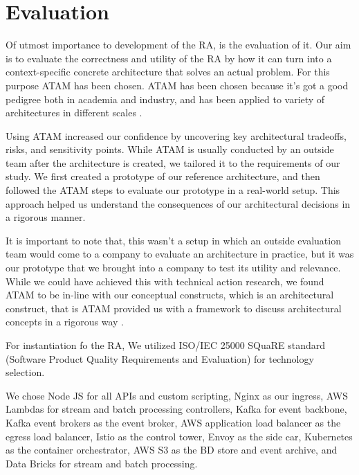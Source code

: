 \documentclass[conference]{IEEEtran}
\begin{document}

\section*{Evaluation}

Of utmost importance to development of the RA, is the evaluation of it. Our aim is to evaluate the correctness and utility of the RA by how it can turn into a context-specific concrete architecture that solves an actual problem. For this purpose ATAM has been chosen. ATAM has been chosen because it's got a good pedigree both in academia and industry, and has been applied to variety of architectures in different scales \cite{SoftwareArchitectureKazman}. 

Using ATAM increased our confidence by uncovering key architectural tradeoffs, risks, and sensitivity points. While ATAM is usually conducted by an outside team after the architecture is created, we tailored it to the requirements of our study. We first created a prototype of our reference architecture, and then followed the ATAM steps to evaluate our prototype in a real-world setup. This approach helped us understand the consequences of our architectural decisions in a rigorous manner.

It is important to note that, this wasn't a setup in which an outside evaluation team would come to a company to evaluate an architecture in practice, but it was our prototype that we brought into a company to test its utility and relevance. While we could have achieved this with technical action research, we found ATAM to be in-line with our conceptual constructs, which is an architectural construct, that is ATAM provided us with a framework to discuss architectural concepts in a rigorous way \cite{wieringa2014design}. 

For instantiation fo the RA, We utilized ISO/IEC 25000 SQuaRE standard (Software Product Quality Requirements and Evaluation) \cite{ISO25000} for technology selection. 


We chose Node JS for all APIs and custom scripting, Nginx as our ingress, AWS Lambdas for stream and batch processing controllers, Kafka for event backbone, Kafka event brokers as the event broker, AWS application load balancer as the egress load balancer, Istio as the control tower, Envoy as the side car, Kubernetes as the container orchestrator, AWS S3 as the BD store and event archive, and Data Bricks for stream and batch processing. 
\end{document}
